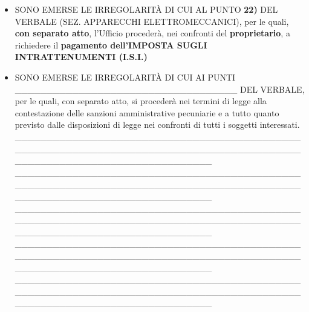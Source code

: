 \documentclass[12pt]{article}
\begin{document}
\begin{itemize}
\_\_\_\_\_\_\_\_\_\_\_\_\_\_\_\_\_\_\_\_\_\_\_\_\_\_\_\_\_\_\_\_\_\_\_\_\_\_\_\_\_\_\_\_\_\_\_\_\_\_\_\_\_\_\_\_\_\_\_\_\_\_\_\_\_\_\_\_\_\_\_\_\_\_\_\_\_\_\_\_\_\_\_\_\_\_\_\_\_\_\_\_\_\_\_\_\_\_\_\_\_\_\_\_\_\_\_\_\_\_\_\_\_\_\_\_\_\_\_\_\_ \\
\_\_\_\_\_\_\_\_\_\_\_\_\_\_\_\_\_\_\_\_\_\_\_\_\_\_\_\_\_\_\_\_\_\_\_\_\_\_\_\_\_\_\_\_\_\_\_\_\_\_\_\_\_\_\_\_\_\_\_\_\_\_\_\_\_\_\_\_\_\_\_\_\_\_\_\_\_\_\_\_\_\_\_\_\_\_\_\_\_\_\_\_\_\_\_\_\_\_\_\_\_\_\_\_\_\_\_\_\_\_\_\_\_\_\_\_\_\_\_\_\_ \\
\item SONO EMERSE LE IRREGOLARITÀ DI CUI AL PUNTO \textbf{22)} DEL VERBALE (SEZ. APPARECCHI ELETTROMECCANICI), per le quali, \textbf{con separato atto}, l’Ufficio procederà, nei confronti del \textbf{proprietario}, a richiedere il \textbf{pagamento dell’IMPOSTA SUGLI INTRATTENUMENTI (I.S.I.)}
\item SONO EMERSE LE IRREGOLARITÀ DI CUI AI PUNTI \_\_\_\_\_\_\_\_\_\_\_\_\_\_\_\_\_\_\_\_\_\_\_\_\_\_\_\_\_\_\_\_\_\_\_ DEL VERBALE, per le quali, con separato atto, si procederà nei termini di legge alla contestazione delle sanzioni amministrative pecuniarie e a tutto quanto previsto dalle disposizioni di legge nei confronti di tutti i soggetti interessati.\\
\_\_\_\_\_\_\_\_\_\_\_\_\_\_\_\_\_\_\_\_\_\_\_\_\_\_\_\_\_\_\_\_\_\_\_\_\_\_\_\_\_\_\_\_\_\_\_\_\_\_\_\_\_\_\_\_\_\_\_\_\_\_\_\_\_\_\_\_\_\_\_\_\_\_\_\_\_\_\_\_\_\_\_\_\_\_\_\_\_\_\_\_\_\_\_\_\_\_\_\_\_\_\_\_\_\_\_\_\_\_\_\_\_\_\_\_\_\_\_\_\_ \\
\_\_\_\_\_\_\_\_\_\_\_\_\_\_\_\_\_\_\_\_\_\_\_\_\_\_\_\_\_\_\_\_\_\_\_\_\_\_\_\_\_\_\_\_\_\_\_\_\_\_\_\_\_\_\_\_\_\_\_\_\_\_\_\_\_\_\_\_\_\_\_\_\_\_\_\_\_\_\_\_\_\_\_\_\_\_\_\_\_\_\_\_\_\_\_\_\_\_\_\_\_\_\_\_\_\_\_\_\_\_\_\_\_\_\_\_\_\_\_\_\_ \\
\_\_\_\_\_\_\_\_\_\_\_\_\_\_\_\_\_\_\_\_\_\_\_\_\_\_\_\_\_\_\_\_\_\_\_\_\_\_\_\_\_\_\_\_\_\_\_\_\_\_\_\_\_\_\_\_\_\_\_\_\_\_\_\_\_\_\_\_\_\_\_\_\_\_\_\_\_\_\_\_\_\_\_\_\_\_\_\_\_\_\_\_\_\_\_\_\_\_\_\_\_\_\_\_\_\_\_\_\_\_\_\_\_\_\_\_\_\_\_\_\_ \\
\_\_\_\_\_\_\_\_\_\_\_\_\_\_\_\_\_\_\_\_\_\_\_\_\_\_\_\_\_\_\_\_\_\_\_\_\_\_\_\_\_\_\_\_\_\_\_\_\_\_\_\_\_\_\_\_\_\_\_\_\_\_\_\_\_\_\_\_\_\_\_\_\_\_\_\_\_\_\_\_\_\_\_\_\_\_\_\_\_\_\_\_\_\_\_\_\_\_\_\_\_\_\_\_\_\_\_\_\_\_\_\_\_\_\_\_\_\_\_\_\_ \\
\_\_\_\_\_\_\_\_\_\_\_\_\_\_\_\_\_\_\_\_\_\_\_\_\_\_\_\_\_\_\_\_\_\_\_\_\_\_\_\_\_\_\_\_\_\_\_\_\_\_\_\_\_\_\_\_\_\_\_\_\_\_\_\_\_\_\_\_\_\_\_\_\_\_\_\_\_\_\_\_\_\_\_\_\_\_\_\_\_\_\_\_\_\_\_\_\_\_\_\_\_\_\_\_\_\_\_\_\_\_\_\_\_\_\_\_\_\_\_\_\_ \\

\end{itemize}
\end{document}
